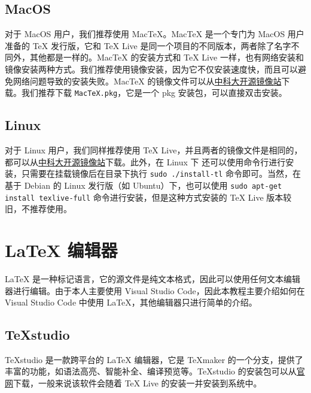\subsection{MacOS}

对于 MacOS 用户，我们推荐使用 MacTeX。MacTeX 是一个专门为 MacOS 用户准备的 TeX 发行版，它和 TeX Live 是同一个项目的不同版本，两者除了名字不同外，其他都是一样的。MacTeX 的安装方式和 TeX Live 一样，也有网络安装和镜像安装两种方式。我们推荐使用镜像安装，因为它不仅安装速度快，而且可以避免网络问题导致的安装失败。MacTeX 的镜像文件可以从\href{https://mirrors.ustc.edu.cn/CTAN/systems/mac/mactex/}{中科大开源镜像站}下载。我们推荐下载 \texttt{MacTeX.pkg}，它是一个 pkg 安装包，可以直接双击安装。

\subsection{Linux}

对于 Linux 用户，我们同样推荐使用 TeX Live，并且两者的镜像文件是相同的，都可以从\href{https://mirrors.ustc.edu.cn/CTAN/systems/texlive/Images/}{中科大开源镜像站}下载。此外，在 Linux 下 还可以使用命令行进行安装，只需要在挂载镜像后在目录下执行 \texttt{sudo ./install-tl} 命令即可。当然，在基于 Debian 的 Linux 发行版（如 Ubuntu）下，也可以使用 \texttt{sudo apt-get install texlive-full} 命令进行安装，但是这种方式安装的 TeX Live 版本较旧，不推荐使用。

\section{LaTeX 编辑器}

LaTeX 是一种标记语言，它的源文件是纯文本格式，因此可以使用任何文本编辑器进行编辑。由于本人主要使用 Visual Studio Code，因此本教程主要介绍如何在 Visual Studio Code 中使用 LaTeX，其他编辑器只进行简单的介绍。

\subsection{TeXstudio}

TeXstudio 是一款跨平台的 LaTeX 编辑器，它是 TeXmaker 的一个分支，提供了丰富的功能，如语法高亮、智能补全、编译预览等。TeXstudio 的安装包可以从\href{https://www.texstudio.org/}{官网}下载，一般来说该软件会随着 TeX Live 的安装一并安装到系统中。

